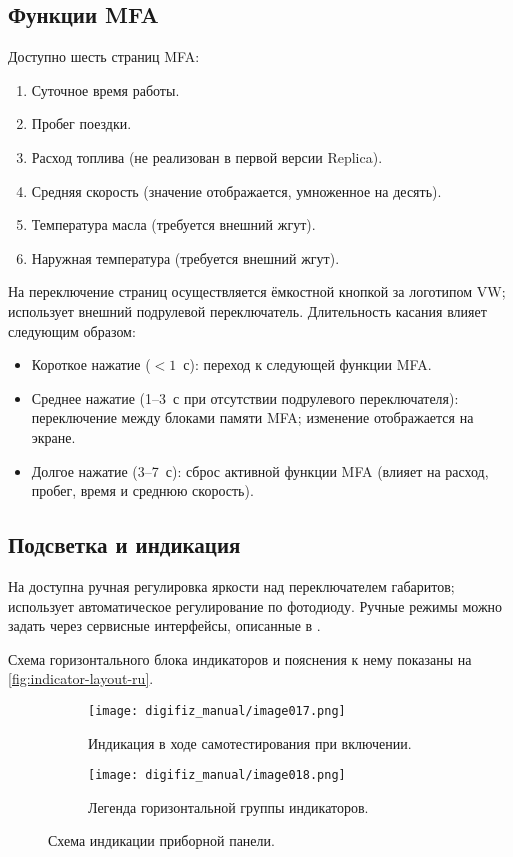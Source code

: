 \subsection{Функции MFA}
Доступно шесть страниц MFA:
\begin{enumerate}
    \item Суточное время работы.
    \item Пробег поездки.
    \item Расход топлива (не реализован в первой версии Replica).
    \item Средняя скорость (значение отображается, умноженное на десять).
    \item Температура масла (требуется внешний жгут).
    \item Наружная температура (требуется внешний жгут).
\end{enumerate}
На \ReplicaGenOneShort{} переключение страниц осуществляется ёмкостной кнопкой за логотипом VW; \ReplicaNextShort{} использует внешний подрулевой переключатель.
Длительность касания влияет следующим образом:
\begin{itemize}
    \item Короткое нажатие (\(<1\)~с): переход к следующей функции MFA.
    \item Среднее нажатие (1--3~с при отсутствии подрулевого переключателя): переключение между блоками памяти MFA; изменение отображается на экране.
    \item Долгое нажатие (3--7~с): сброс активной функции MFA (влияет на расход, пробег, время и среднюю скорость).
\end{itemize}

\subsection{Подсветка и индикация}
На \ReplicaGenOneShort{} доступна ручная регулировка яркости над переключателем габаритов; \ReplicaNextShort{} использует автоматическое регулирование по фотодиоду.
Ручные режимы можно задать через сервисные интерфейсы, описанные в .

Схема горизонтального блока индикаторов и пояснения к нему показаны на \autoref{fig:indicator-layout-ru}.

\begin{figure}[htbp]
    \centering
    \begin{subfigure}{0.48\textwidth}
        \texttt{[image: digifiz\_manual/image017.png]}
        \caption{Индикация в ходе самотестирования при включении.}
    \end{subfigure}\hfill
    \begin{subfigure}{0.48\textwidth}
        \texttt{[image: digifiz\_manual/image018.png]}
        \caption{Легенда горизонтальной группы индикаторов.}
    \end{subfigure}
    \caption{Схема индикации приборной панели.}
    \label{fig:indicator-layout-ru}
\end{figure}


